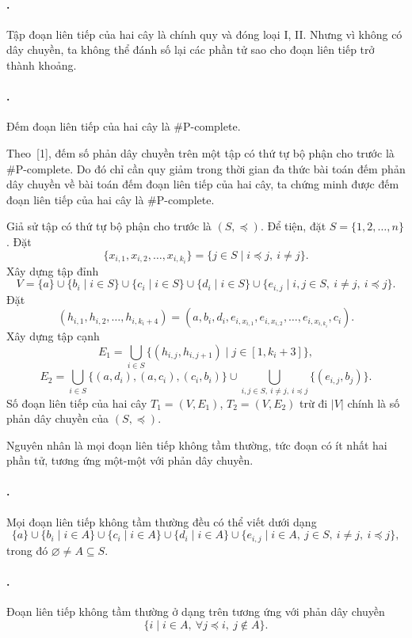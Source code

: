 \documentclass[11pt]{article}
\begin{document}
\paragraph{.}
Tập đoạn liên tiếp của hai cây là chính quy và đóng loại I, II. Nhưng vì
không có dây chuyền, ta không thể đánh số lại các phần tử sao cho đoạn liên
tiếp trở thành khoảng.

\paragraph{.}
Đếm đoạn liên tiếp của hai cây là \#P-complete.

Theo~[1], đếm số phản dây chuyền trên một tập có thứ tự bộ phận cho trước là
\#P-complete. Do đó chỉ cần quy giảm trong thời gian đa thức bài toán đếm phản
dây chuyền về bài toán đếm đoạn liên tiếp của hai cây, ta chứng minh được đếm
đoạn liên tiếp của hai cây là \#P-complete.

Giả sử tập có thứ tự bộ phận cho trước là $(S,\preceq)$. Để tiện, đặt
$S=\{1,2,\ldots,n\}$. Đặt
\[
  \{x_{i,1},x_{i,2},\ldots,x_{i,k_i}\}
  =\{j\in S\mid i\preceq j,\ i\ne j\}.
\]
Xây dựng tập đỉnh
\[
  V=\{a\}\cup\{b_i\mid i\in S\}\cup\{c_i\mid i\in S\}
  \cup\{d_i\mid i\in S\}
  \cup\{e_{i,j}\mid i,j\in S,\ i\ne j,\ i\preceq j\}.
\]
Đặt
\[
  (h_{i,1},h_{i,2},\ldots,h_{i,k_i+4})
  =(a,b_i,d_i,e_{i,x_{i,1}},e_{i,x_{i,2}},\ldots,e_{i,x_{i,k_i}},c_i).
\]
Xây dựng tập cạnh
\[
  E_1=\bigcup_{i\in S}\{(h_{i,j},h_{i,j+1})\mid j\in[1,k_i+3]\},
\]
\[
  E_2=\bigcup_{i\in S}\{(a,d_i),(a,c_i),(c_i,b_i)\}
  \cup
  \bigcup_{i,j\in S,\ i\ne j,\ i\preceq j}\{(e_{i,j},b_j)\}.
\]
Số đoạn liên tiếp của hai cây $T_1=(V,E_1)$, $T_2=(V,E_2)$ trừ đi $|V|$ chính
là số phản dây chuyền của $(S,\preceq)$.

Nguyên nhân là mọi đoạn liên tiếp không tầm thường, tức đoạn có ít nhất hai
phần tử, tương ứng một-một với phản dây chuyền.

\paragraph{.}
Mọi đoạn liên tiếp không tầm thường đều có thể viết dưới dạng
\[
  \{a\}\cup\{b_i\mid i\in A\}\cup\{c_i\mid i\in A\}
  \cup\{d_i\mid i\in A\}
  \cup\{e_{i,j}\mid i\in A,\ j\in S,\ i\ne j,\ i\preceq j\},
\]
trong đó $\varnothing\ne A\subseteq S$.

\paragraph{.}
Đoạn liên tiếp không tầm thường ở dạng trên tương ứng với phản dây chuyền
\[
  \{i\mid i\in A,\ \forall j\preceq i,\ j\notin A\}.
\]
\end{document}
